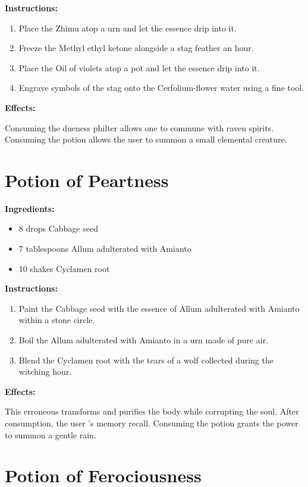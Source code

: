 \documentclass{article}
\begin{document}
\textbf{Instructions:}

\begin{enumerate}
  \item Place the Zhimu atop a urn and let the essence drip into it.
  \item Freeze the Methyl ethyl ketone alongside a stag feather an hour.
  \item Place the Oil of violets atop a pot and let the essence drip into it.
  \item Engrave symbols of the stag onto the Cerfolium-flower water using a fine tool.
\end{enumerate}

\textbf{Effects:}

Consuming the dueness philter allows one to commune with raven spirits. Consuming the potion allows the user to summon a small elemental creature.

\newpage
\section*{Potion of Peartness}

\textbf{Ingredients:}

\begin{itemize}
  \item 8 drops Cabbage seed
  \item 7 tablespoons Allum adulterated with Amianto
  \item 10 shakes Cyclamen root
\end{itemize}

\textbf{Instructions:}

\begin{enumerate}
  \item Paint the Cabbage seed with the essence of Allum adulterated with Amianto within a stone circle.
  \item Boil the Allum adulterated with Amianto in a urn made of pure air.
  \item Blend the Cyclamen root with the tears of a wolf collected during the witching hour.
\end{enumerate}

\textbf{Effects:}

This erroneous transforms and purifies the body while corrupting the soul. After consumption, the user 's memory recall. Consuming the potion grants the power to summon a gentle rain.

\newpage
\section*{Potion of Ferociousness}
\end{document}
